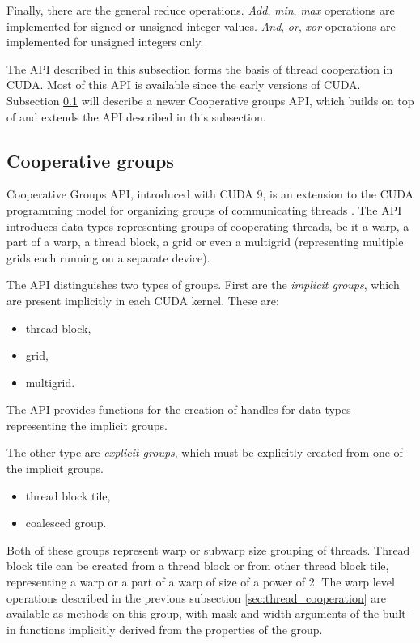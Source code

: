Finally, there are the general reduce operations. \textit{Add}, \textit{min}, \textit{max} operations are implemented for signed or unsigned integer values. \textit{And}, \textit{or}, \textit{xor} operations are implemented for unsigned integers only.

The API described in this subsection forms the basis of thread cooperation in CUDA. Most of this API is available since the early versions of CUDA. Subsection \ref{sec:cooperative_groups} will describe a newer Cooperative groups API, which builds on top of and extends the API described in this subsection.

\subsection{Cooperative groups}
\label{sec:cooperative_groups}

Cooperative Groups API, introduced with CUDA 9, is an extension to the CUDA programming model for organizing groups of communicating threads \citep{site:cuda}. The API introduces data types representing groups of cooperating threads, be it a warp, a part of a warp, a thread block, a grid or even a multigrid (representing multiple grids each running on a separate device). 


The API distinguishes two types of groups. First are the \textit{implicit groups}, which are present implicitly in each CUDA kernel. These are:

\begin{itemize}
	\item thread block,
	\item grid,
	\item multigrid.
\end{itemize}

The API provides functions for the creation of handles for data types representing the implicit groups. 

The other type are \textit{explicit groups}, which must be explicitly created from one of the implicit groups. 

\begin{itemize}
	\item thread block tile,
	\item coalesced group.
\end{itemize}

Both of these groups represent warp or subwarp size grouping of threads. Thread block tile can be created from a thread block or from other thread block tile, representing a warp or a part of a warp of size of a power of 2. The warp level operations described in the previous subsection \ref{sec:thread_cooperation} are available as methods on this group, with mask and width arguments of the built-in functions implicitly derived from the properties of the group. 

